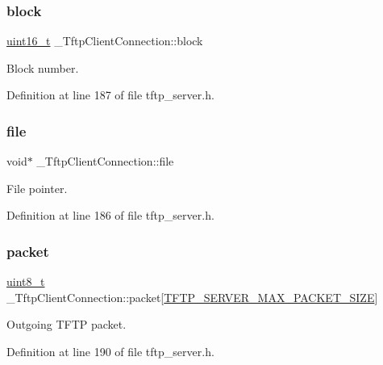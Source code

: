 \subsubsection{\texorpdfstring{block}{block}}
{\footnotesize\ttfamily \hyperlink{stdint_8h_a273cf69d639a59973b6019625df33e30}{uint16\+\_\+t} \+\_\+\+Tftp\+Client\+Connection\+::block}



Block number. 



Definition at line 187 of file tftp\+\_\+server.\+h.

\mbox{\label{struct__TftpClientConnection_a2e93e9d3b564afe99f7905cabe37aded}} 
\subsubsection{\texorpdfstring{file}{file}}
{\footnotesize\ttfamily void$\ast$ \+\_\+\+Tftp\+Client\+Connection\+::file}



File pointer. 



Definition at line 186 of file tftp\+\_\+server.\+h.

\mbox{\label{struct__TftpClientConnection_af43957a98e59a481f7988a21e1c5d9d4}} 
\subsubsection{\texorpdfstring{packet}{packet}}
{\footnotesize\ttfamily \hyperlink{stdint_8h_aba7bc1797add20fe3efdf37ced1182c5}{uint8\+\_\+t} \+\_\+\+Tftp\+Client\+Connection\+::packet\mbox{[}\hyperlink{tftp__server_8h_a691c548eb2ec25b559ea9029f36a5276}{T\+F\+T\+P\+\_\+\+S\+E\+R\+V\+E\+R\+\_\+\+M\+A\+X\+\_\+\+P\+A\+C\+K\+E\+T\+\_\+\+S\+I\+ZE}\mbox{]}}



Outgoing T\+F\+TP packet. 



Definition at line 190 of file tftp\+\_\+server.\+h.

